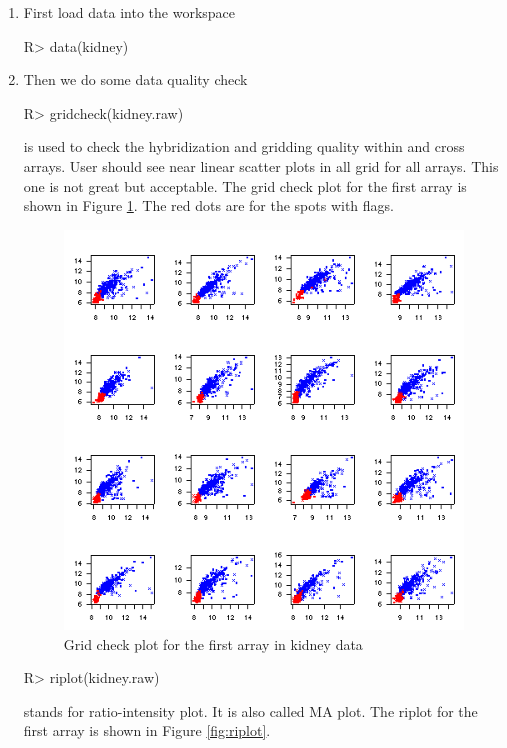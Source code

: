 \begin{enumerate}
\item First load data into the workspace
\begin{Sinput}
R> data(kidney)
\end{Sinput}
\item Then we do some data quality check
\begin{Sinput}
R> gridcheck(kidney.raw)
\end{Sinput}
 is used to check the hybridization 
and gridding quality within and
cross arrays. User should see near linear scatter 
plots in all grid for all arrays. 
This one is not great but acceptable. The grid check plot for the first array
is shown in Figure \ref{fig:gridcheck}. The red dots are for the spots with flags.
\begin{figure}[htbp]
\centering
\includegraphics{gridcheck.png}
\caption{Grid check plot for the first array in kidney data}
\label{fig:gridcheck}
\end{figure}
\begin{Sinput}
R> riplot(kidney.raw)
\end{Sinput}
 stands for ratio-intensity plot. It is also called MA plot. 
The riplot for the first array is shown in Figure \ref{fig:riplot}. 
\begin{figure}[htbp]
\centering

\end{figure}
\end{enumerate}
